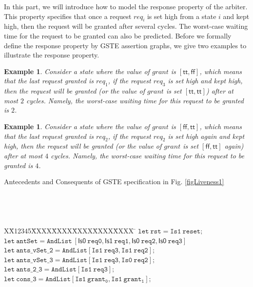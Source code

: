 \documentclass[final]{IEEEtran}
\newtheorem{example}[theorem]{Example}
\newlength{\fminilength}
\newenvironment{fmini}[1][\linewidth]
  {\setlength{\fminilength}{#1\fboxsep-2\fboxrule}%
   \vspace{2ex}\noindent\begin{lrbox}{\fminibox}\begin{minipage}{\fminilength}%
   \mbox{ }\hfill\vspace{-2.5ex}}%
  {\end{minipage}\end{lrbox}\vspace{1ex}\hspace{0ex}%
   \framebox{\usebox{\fminibox}}}
\newenvironment{specification}
{\noindent\footnotesize\tt\begin{fmini}\begin{tabbing}X\=X12345\=XXXX\=XXXX\=XXXX\=XXXX\=XXXX
\=\+\kill} {\end{tabbing}\normalfont\end{fmini}}
\begin{document}
 In this part, we will introduce how to model the
response property of the arbiter. This property specifies that  once a request $req_i$ is
set high from a state $i$ and kept high, then the request will be
granted after several cycles. The worst-case waiting time for the
request to be granted can also be predicted. Before we
 formally define the response property by GSTE assertion graphs, we give two examples to illustrate the response
 property.

 \begin{example}\label{livenessExample1}
Consider a state where the value of $grant$ is $[\mathsf{tt,ff}]$,
which means that the last request granted is $req_{1}$, if the
request $req_{3}$ is set high and kept high, then the request will
be granted (or the value of $grant$ is set $[\mathsf{tt,tt}]$) after
at most $2$ cycles. Namely, the  worst-case waiting time for
 this request to be granted is $2$.
\end{example}

\begin{example}\label{livenessExample2}
Consider a state where the value of $grant$ is $[\mathsf{ff,tt}]$,
which means that the last request granted is $req_{2}$, if the
request $req_{2}$ is set high again and kept high, then the request will
be granted (or the value of $grant $ is set $[\mathsf{ff,tt}]$
again) after at most $4$ cycles. Namely, the  worst-case waiting
time for
 this request to be granted is $4$.
\end{example}

\vspace{2mm}
\begin{center}
\begin{table}
\caption{Antecedents and Consequents of   GSTE specification in Fig.
\ref{figLiveness1}}
\begin{specification}
$\mathtt{let\ rst = Is1 \  reset  ;}$\\



$\mathtt{let\ antSet= AndList\ [\mathsf{Is0}\ req0, \mathsf{Is1}\
req1,\mathsf{Is0}\ req2,\mathsf{Is0}\ req3]}$ \\

$\mathtt{let\ ants\_vSet\_2 = AndList [Is1\ req3,Is1\ req2];}$\\

 $\mathtt{let\  ants\_vSet\_3 = AndList [Is1\ req3,Is0\ req2 ];}$\\
$\mathtt{let\ ants\_2\_3 = AndList [Is1\ req3 ];
}$\\

 $\mathtt{let\ cons\_3=AndList[Is1 \ grant_0, Is1\ grant_1];}$\\
 \end{specification}

\end{table}
\end{center}
\end{document}
